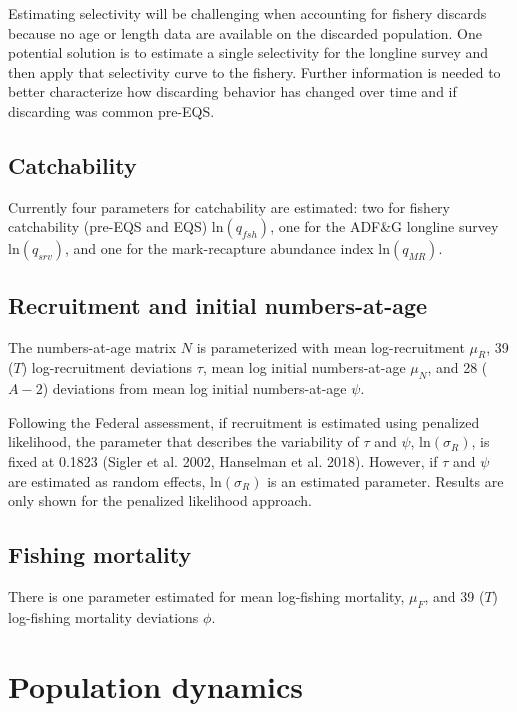 \documentclass[]{article}
\begin{document}
Estimating selectivity will be challenging when accounting for fishery
discards because no age or length data are available on the discarded
population. One potential solution is to estimate a single selectivity
for the longline survey and then apply that selectivity curve to the
fishery. Further information is needed to better characterize how
discarding behavior has changed over time and if discarding was common
pre-EQS.

\subsection{Catchability}\label{catchability}

Currently four parameters for catchability are estimated: two for
fishery catchability (pre-EQS and EQS) \(\text{ln}(q_{fsh})\), one for
the ADF\&G longline survey \(\text{ln}(q_{srv})\), and one for the
mark-recapture abundance index \(\text{ln}(q_{MR})\).

\subsection{Recruitment and initial
numbers-at-age}\label{recruitment-and-initial-numbers-at-age}

The numbers-at-age matrix \(N\) is parameterized with mean
log-recruitment \(\mu_R\), 39 (\(T\)) log-recruitment deviations
\(\tau\), mean log initial numbers-at-age \(\mu_N\), and 28 (\(A-2\))
deviations from mean log initial numbers-at-age \(\psi\).

Following the Federal assessment, if recruitment is estimated using
penalized likelihood, the parameter that describes the variability of
\(\tau\) and \(\psi\), \(\text{ln}(\sigma_R)\), is fixed at 0.1823
(Sigler et al. 2002, Hanselman et al. 2018). However, if \(\tau\) and
\(\psi\) are estimated as random effects, \(\text{ln}(\sigma_R)\) is an
estimated parameter. Results are only shown for the penalized likelihood
approach.

\subsection{Fishing mortality}\label{fishing-mortality}

There is one parameter estimated for mean log-fishing mortality,
\(\mu_F\), and 39 (\(T\)) log-fishing mortality deviations \(\phi\).

\section{Population dynamics}\label{population-dynamics}
\end{document}
